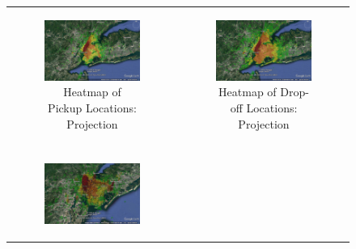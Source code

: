 \documentclass{article}
\begin{document}
\begin{figure}

\begin{tabular}{cc}
\begin{subfigure}{.5\linewidth}
  \centering
  \includegraphics[width=.8\linewidth]{pickup_overhead.jpg}
  \caption{Heatmap of Pickup Locations: Projection}
  \label{sub:pu_oh}
\end{subfigure} & 
\begin{subfigure}{.5\linewidth}
  \centering
  \includegraphics[width=.8\linewidth]{dropoff_overhead.jpg}
  \caption{Heatmap of Drop-off Locations: Projection}
  \label{sub:do_oh}
\end{subfigure} \\\\
\begin{subfigure}{.5\linewidth}
  \centering
  \includegraphics[width=.8\linewidth]{pickup_ne.jpg}

\end{subfigure}
\end{tabular}
\end{figure}
\end{document}

